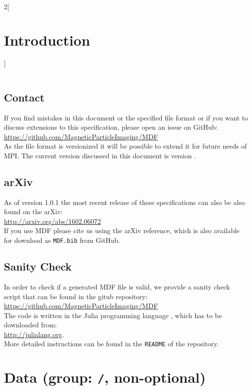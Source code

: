 \documentclass[landscape,a4paper]{article} %
\newcommand{\inl}[1]{\lstinline[columns=fixed]{#1}}
\begin{document}
\begin{multicols}{2}[\section{Introduction} \label{Sec:Introduction}]
\begin{tabularx}{\columnwidth}{lX}
\end{tabularx}


\subsection{Contact}

If you find mistakes in this document or the specified file format or if you want to discuss extensions to this specification, please open an issue on GitHub:\\
\hspace*{1cm}\url{https://github.com/MagneticParticleImaging/MDF}\\
As the file format is versionized it will be possible to extend it for future needs of MPI. The current version discussed in this document is version \version.

\subsection{arXiv}
As of version 1.0.1 the most recent release of these specifications can also be also found on the arXiv:\\
\hspace*{1cm}\url{http://arxiv.org/abs/1602.06072}\\
If you use MDF please cite us using the arXiv reference, which is also available for download as \texttt{MDF.bib} from GitHub.

\subsection{Sanity Check}

In order to check if a generated MDF file is valid, we provide a sanity check script that can be found in the gitub repository:\\
\hspace*{1cm}\url{https://github.com/MagneticParticleImaging/MDF}\\
The code is written in the Julia programming language \cite{Bezanson2012,Bezanson2014,Bezanson2014a}, which has to be downloaded from: \\
\hspace*{1cm} \url{http://julialang.org}.\\
More detailed instructions can be found in the \texttt{README} of the repository.

\end{multicols}

\section{Data (group: \inl{/}, non-optional)}
 \setlength\extrarowheight{5pt}
\end{document}
